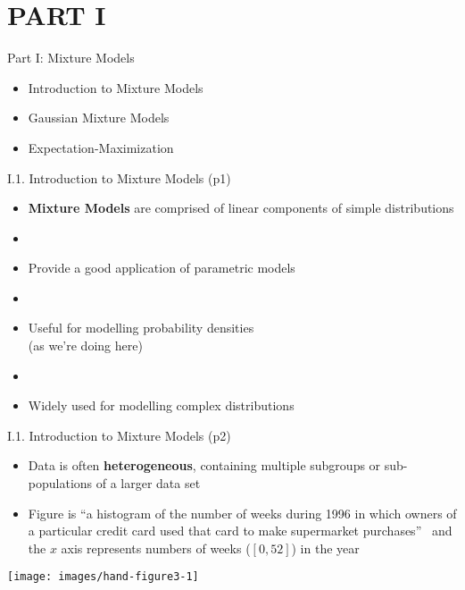 \documentclass[handout]{beamer}
\newcommand{\stronger}[1]{\textbf{\color{purple} #1}}
\begin{document}
\section{PART I}
\begin{frame}{Part I: Mixture Models}
\begin{itemize}
\item[I.1.] Introduction to Mixture Models
\item[I.2.] Gaussian Mixture Models
\item[I.3.] Expectation-Maximization
\end{itemize}
\end{frame}
\begin{frame}{I.1. Introduction to Mixture Models (p1)} %
\begin{itemize}
\item \stronger{Mixture Models} are comprised of linear components of simple distributions
\item[]
\item Provide a good application of parametric models
\item[]
\item Useful for modelling probability densities\\
	(as we're doing here)
\item[]
\item Widely used for modelling complex distributions
\end{itemize}
\end{frame}
\begin{frame}{I.1. Introduction to Mixture Models (p2)}
\begin{itemize}
\item Data is often \stronger{heterogeneous}, containing multiple subgroups or sub-populations of a larger data set
\item Figure is ``a histogram of the number of weeks during 1996 in which owners of a particular credit card used that card to make supermarket purchases''~\cite[p.57]{hand-et-al:2001} and the $x$ axis represents numbers of weeks ($[0,52]$) in the year
\end{itemize}
\begin{center}
\texttt{[image: images/hand-figure3-1]}\\
\cite[Figure 3.1]{hand-et-al:2001}
\end{center}
\end{frame}
\end{document}
